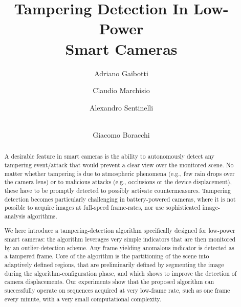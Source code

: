 \documentclass{llncs}
\begin{document}
\title{Tampering Detection In Low-Power \\ Smart Cameras}

\author{Adriano Gaibotti \and Claudio Marchisio \and Alexandro Sentinelli \and \\ Giacomo Boracchi}

\maketitle

\begin{abstract}
A desirable feature in smart cameras is the ability to autonomously detect any tampering event/attack that would prevent a clear view over the monitored scene. No matter whether tampering is due to atmospheric phenomena (e.g., few rain drops over the camera lens) or to malicious attacks (e.g., occlusions or the device displacement), these have to be promptly detected to possibly activate countermeasures. Tampering detection becomes particularly challenging in battery-powered cameras, where it is not possible to acquire images at full-speed  frame-rates, nor use sophisticated image-analysis algorithms. 

We here introduce a tampering-detection algorithm specifically designed for low-power smart cameras: the algorithm leverages very simple indicators that are then monitored by an outlier-detection scheme. Any frame yielding anomalous indicator is detected as a tampered frame. Core of the algorithm is the partitioning of the scene into adaptively defined regions, that are preliminarily defined by segmenting the image during the algorithm-configuration phase, and which shows to improve the detection of camera displacements. Our experiments show that the proposed algorithm can successfully operate on sequences acquired at very low-frame rate, such as one frame every minute, with a very small computational complexity. %
\end{abstract}
\end{document}
